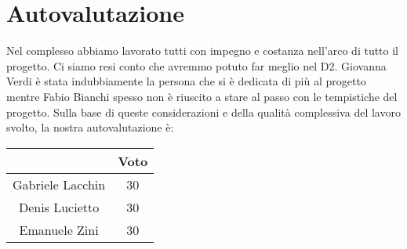 \documentclass{article}
\begin{document}
\section{Autovalutazione}
Nel complesso abbiamo lavorato tutti con impegno e costanza nell'arco di tutto il progetto. Ci
siamo resi conto che avremmo potuto far meglio nel D2. Giovanna Verdi è stata indubbiamente
la persona che si è dedicata di più al progetto mentre Fabio Bianchi spesso non è riuscito a
stare al passo con le tempistiche del progetto. Sulla base di queste considerazioni e della
qualità complessiva del lavoro svolto, la nostra autovalutazione è:

\begin{center}
    \begin{tabular}{|c|c|}
        \hline
                         & Voto \\
        \hline
        Gabriele Lacchin & 30   \\
        \hline
        Denis Lucietto   & 30   \\
        \hline
        Emanuele Zini    & 30   \\
        \hline
    \end{tabular}
\end{center}
\end{document}
